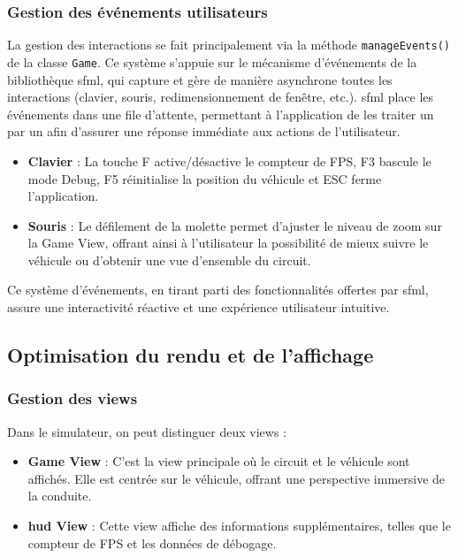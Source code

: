 \subsubsection{Gestion des événements utilisateurs}\label{subsubsec:gestion-des-evenements-utilisateurs}
La gestion des interactions se fait principalement via la méthode \texttt{manageEvents()} de la classe \texttt{Game}.
Ce système s'appuie sur le mécanisme d'événements de la bibliothèque \gls{sfml}, qui capture et gère de manière asynchrone toutes les interactions (clavier, souris, redimensionnement de fenêtre, etc.).
\gls{sfml} place les événements dans une file d'attente, permettant à l'application de les traiter un par un afin d'assurer une réponse immédiate aux actions de l'utilisateur.

\begin{itemize}
    \item \textbf{Clavier} : La touche F active/désactive le compteur de FPS, F3 bascule le mode Debug, F5 réinitialise la position du véhicule et ESC ferme l'application.
    \item \textbf{Souris} : Le défilement de la molette permet d'ajuster le niveau de zoom sur la Game View, offrant ainsi à l'utilisateur la possibilité de mieux suivre le véhicule ou d'obtenir une vue d'ensemble du circuit.
\end{itemize}

Ce système d'événements, en tirant parti des fonctionnalités offertes par \gls{sfml}, assure une interactivité réactive et une expérience utilisateur intuitive.

\subsection{Optimisation du rendu et de l'affichage}\label{subsec:optimisation-du-rendu-et-de-l-affichage}
\subsubsection{Gestion des \glspl{view}}\label{subsubsec:gestion-des-vues}
Dans le simulateur, on peut distinguer deux \glspl{view} :
\begin{itemize}
    \item \textbf{Game View} : C'est la \gls{view} principale où le circuit et le véhicule sont affichés.
    Elle est centrée sur le véhicule, offrant une perspective immersive de la conduite.
    \item \textbf{\gls{hud} View} : Cette \gls{view} affiche des informations supplémentaires, telles que le compteur de FPS et les données de débogage.
\end{itemize}

